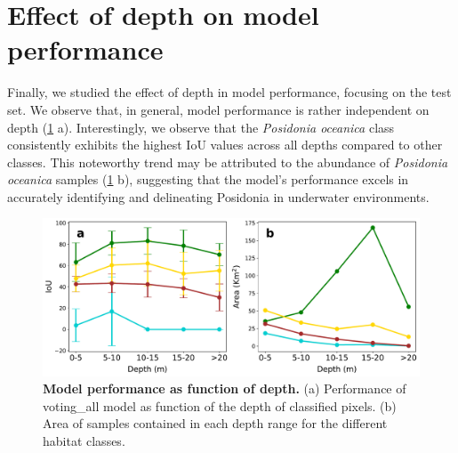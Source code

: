 \section{Effect of depth on model performance}\label{app:depth}

Finally, we studied the effect of depth in model performance, focusing on
the test set. We observe that, in general, model performance is rather
independent on depth (\cref{fig:IoU_class_depth} a). Interestingly, we observe
that the \textit{Posidonia oceanica} class consistently exhibits the highest
IoU values across all depths compared to other classes. This noteworthy trend
may be attributed to the abundance of \textit{Posidonia oceanica} samples
(\cref{fig:IoU_class_depth} b), suggesting that the model's performance excels
in accurately identifying and delineating Posidonia in underwater environments.

\begin{figure}[H]
    \centering
    \includegraphics[width=\textwidth]{Figures/IoU_class_depth.pdf}
    \caption[Model performance as function of depth]{\textbf{Model performance
            as function of depth.} (a) Performance of voting\_all model as
        function of the
        depth
        of classified pixels. (b) Area of samples contained in each depth range
        for the
        different habitat classes.}
    \label{fig:IoU_class_depth}
\end{figure}

